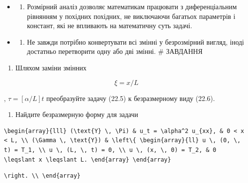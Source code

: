 \documentclass[
  ukrainian,
]{article}
\providecommand{\tightlist}{%
  \setlength{\itemsep}{0pt}\setlength{\parskip}{0pt}}
\begin{document}
\begin{itemize}
\tightlist
\item
  \begin{enumerate}
  \def\labelenumi{\arabic{enumi}.}
  \setcounter{enumi}{1}
  \tightlist
  \item
    Розмірний аналіз дозволяє математикам працювати з диференціальним
    рівнянням у похідних похідних, не виключаючи багатьох параметрів і
    констант, які не впливають на математичну суть задачі.
  \end{enumerate}
\item
  \begin{enumerate}
  \def\labelenumi{\arabic{enumi}.}
  \setcounter{enumi}{2}
  \tightlist
  \item
    Не завжди потрібно конвертувати всі змінні у безрозмірний вигляд,
    іноді достатньо перетворити одну або дві змінні. \# ЗАВДАННЯ
  \end{enumerate}
\end{itemize}

\begin{enumerate}
\def\labelenumi{\arabic{enumi}.}
\tightlist
\item
  Шляхом заміни змінних
\end{enumerate}

\[
\xi = x/L
\]

, \(\tau = [\alpha/L] t\) преобразуйте задачу (22.5) к безразмерному
виду (22.6).

\begin{enumerate}
\def\labelenumi{\arabic{enumi}.}
\setcounter{enumi}{1}
\tightlist
\item
  Найдите безразмерную форму для задачи
\end{enumerate}

\begin{verbatim}
\begin{array}{lll} (\text{Y} \, \Pi) & u_t = \alpha^2 u_{xx}, & 0 < x < L, \\ (\Gamma \, \text{Y}) & \left\{ \begin{array}{ll} u \, (0, \, t) = T_1, \\ u \, (L, \, t) = 0, \\ u \, (x, \, 0) = T_2, & 0 \leqslant x \leqslant L. \end{array} \end{array}
\end{verbatim}

\begin{verbatim}
\right. \\ \end{array}
\end{verbatim}
\end{document}
